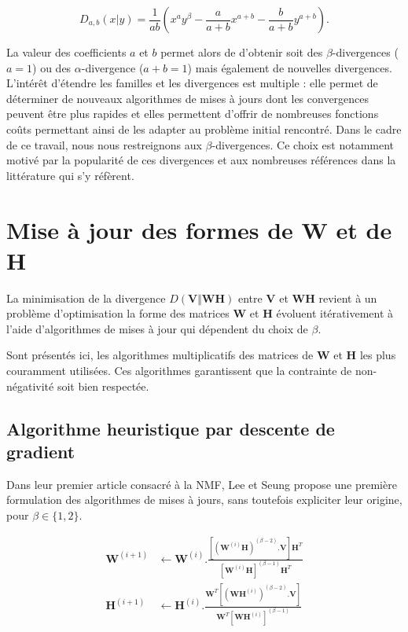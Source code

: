 \begin{equation}\label{eq:expression_gen_alpha_beta}
D_{a, b}(x \vert y) = \frac{1}{a b}\left(x^{a}y^{\beta}- \frac{a}{a+b}x^{a + b}-\frac{b}{a+b}y^{a+b} \right).
\end{equation}

La valeur des coefficients $a$ et $b$ permet alors de d'obtenir soit des $\beta$-divergences ($a = 1$) ou des $\alpha$-divergence ($a+b = 1$) mais également de nouvelles divergences. L'intérêt d'étendre les familles et les divergences est multiple : elle permet de déterminer de nouveaux algorithmes de mises à jours dont les convergences peuvent être plus rapides et elles permettent d'offrir de nombreuses fonctions coûts permettant ainsi de les adapter au problème initial rencontré. Dans le cadre de ce travail, nous nous restreignons aux $\beta$-divergences. Ce choix est notamment motivé par la popularité de ces divergences et aux nombreuses références dans la littérature qui s'y réfèrent.

\section{Mise à jour des formes de \textbf{W} et de \textbf{H}}

La minimisation de la divergence $D(\mathbf{V} \Vert \mathbf{WH})$ entre $\mathbf{V}$ et $\mathbf{WH}$ revient à un problème d'optimisation la forme des matrices $\mathbf{W}$ et $\mathbf{H}$ évoluent itérativement à l'aide d'algorithmes de mises à jour qui dépendent du choix de $\beta$. 

Sont présentés ici, les algorithmes multiplicatifs des matrices de $\mathbf{W}$ et $\mathbf{H}$ les plus couramment utilisées. Ces algorithmes garantissent que la contrainte de non-négativité soit bien respectée.

\subsection{Algorithme heuristique par descente de gradient}

Dans leur premier article consacré à la NMF, Lee et Seung \cite{lee_learning_1999} propose une première formulation des algorithmes de mises à jours, sans toutefois expliciter leur origine,  pour $\beta  \in \lbrace 1,2 \rbrace$.

\begin{subequations}\label{eq:WHupdateGD}
\begin{align}
\textbf{W}^{(i+1)} &\leftarrow \textbf{W}^{(i)}.\frac{\left[\left(\textbf{W}^{(i)}\mathbf{H} \right)^{(\beta-2)}.\textbf{V} \right]\textbf{H}^T}{\left[\textbf{W}^{(i)}\mathbf{H} \right]^{(\beta-1)}\textbf{H}^T}\\
\textbf{H}^{(i+1)} &\leftarrow \textbf{H}^{(i)}.\frac{\textbf{W}^T \left[\left(\textbf{WH}^{(i)} \right)^{(\beta-2)}.\textbf{V} \right]}{\textbf{W}^T \left[\textbf{WH}^{(i)} \right]^{(\beta-1)}}
\end{align}
\end{subequations}

